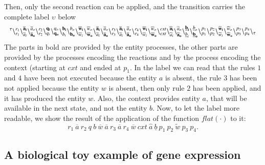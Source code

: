 Then, only the second reaction can be applied, and the transition carries the complete label $\upsilon$ below
{\tiny
\[
 {}^{\tau}
 \backslash_{r_1}^{r_1}
 \backslash_{\overline{a}_i}^{\bf  \overline{a}_i}\backslash_{\bf \overline{a}_o}^{\overline{a}_o}
 \backslash_{r_2}^{r_2}
 \backslash_{q_i}^{\bf q_i}\backslash_{\bf q_o}^{q_o}
 \backslash_{b_i}^{\bf b_i}\backslash_{\bf b_o}^{b_o}
 \backslash_{\overline{w}_i}^{\bf \overline{w}_i}\backslash_{\bf \overline{w}_o}^{\overline{w}_o}
 \backslash_{\overline{a}_i}^{\bf \overline{a}_i}\backslash_{\bf \overline{a}_o}^{\overline{a}_o}
 \backslash_{r_3}^{r_3}
 \backslash_{\overline{a}_i}^{\bf \overline{a}_i}\backslash_{\bf \overline{a}_o}^{\overline{a}_o}
 \backslash_{r_4}^{r_4}
 \backslash_{\overline{w}_i}^{\bf \overline{w}_i}\backslash_{\bf \overline{w}_o}^{\overline{w}_o}
 \backslash_{\mathit{cxt}}^{\mathit{cxt}}
 \backslash_{\widehat{a}_i}^{\bf \widehat{a}_i}\backslash_{\bf \widehat{a}_o}^{\widehat{a}_o}
 \backslash_{\underline{b}_i}^{\bf \underline{b}_i}\backslash_{\bf \underline{b}_o}^{\underline{b}_o}
 \backslash_{p_1}^{p_1}
 \backslash_{p_2}^{p_2}
 \backslash_{\widetilde{w}_i}^{\bf \widetilde{w}_i}\backslash_{\bf \widetilde{w}_o}^{\widetilde{w}_o}
 \backslash_{p_3}^{p_3}
 \backslash_{p_4}^{p_4}
 \backslash_{\tau}
\]}
The parts in bold are provided by the entity processes, the other parts are provided by the processes encoding the reactions and by the process encoding the context (starting at $\mathit{cxt}$ and ended at $p_1$.
In the label we can read that the rules $1$ and $4$ have been not executed because the entity $a$ is absent, 
the rule $3$ has been not applied because the entity $w$ is absent, then only rule $2$ has been applied, and it has produced the entity $w$. Also,  the context provides entity $a$, that will be available in the next state, and not the entity $b$.
Now, to let the label more readable, we show the result of the application of the function $flat(\cdot)$ to it:
\[
r_1~\overline{a}~r_2~q~b~\overline{w}~\overline{a}~r_3~\overline{a}~r_4~\overline{w}~\mathit{cxt}~\widehat{a}~\underline{b}~p_1~p_2~\widetilde{w}~p_3~p_4 .
\]


\subsection{A  biological toy example of gene expression}\label{subsec:toy}

